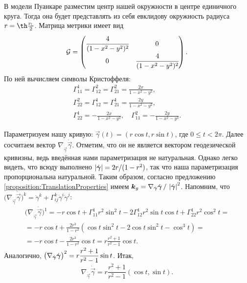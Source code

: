 \begin{solution}
	В модели Пуанкаре разместим центр нашей окружности в центре единичного круга. Тогда она будет представлять из себя евклидову окружность радиуса $r = \th\frac{r_{\mathbb{L}}}{2}$. Матрица метрики имеет вид
	\[
		\mathcal{G} =
		\begin{pmatrix}
			\cfrac{4}{(1 - x^2 - y^2)^2} & 0\\
			0 & \cfrac{4}{(1 - x^2 - y^2)^2}\\
		\end{pmatrix}.
	\]
	По ней вычисляем символы Кристоффеля:
	\begin{gather*}
		\Gamma_{11}^1 = \Gamma_{12}^2 = \Gamma_{21}^2 = \frac{2x}{1 - x^2 - y^2},\\
		\Gamma_{22}^2 = \Gamma_{12}^1 = \Gamma_{21}^1 = \frac{2y}{1 - x^2 - y^2},\\
		\Gamma_{22}^1 = -\frac{2x}{1 - x^2 - y^2},\quad\Gamma_{11}^2 = -\frac{2y}{1 - x^2 - y^2}.
	\end{gather*}

	Параметризуем нашу кривую: $\vec{\gamma}(t) = (r\cos t, r\sin t)$, где $0 \leqslant t < 2\pi$. Далее сосчитаем вектор $\nabla_{\dot{\vec{\gamma}}}\dot{\vec{\gamma}}$. Отметим, что он не является вектором геодезической кривизны, ведь введённая нами параметризация не натуральная. Однако легко видеть, что всюду выполнено $\left\lvert\dot{\boldsymbol{\gamma}}\right\rvert = 2r / (1 - r^2)$, так что наша параметризация пропорциональна натуральной. Таким образом, согласно предложению \ref{proposition:TranslationProperties} имеем $\boldsymbol{k}_g = \nabla_{\dot{\boldsymbol{\gamma}}}\dot{\boldsymbol{\gamma}}\,/\,\left\lvert\dot{\boldsymbol{\gamma}}\right\rvert^2$. Напомним, что $\big(\nabla_{\dot{\vec{\gamma}}}\dot{\vec{\gamma}}\big)^k = \ddot{\gamma}^k + \Gamma_{ij}^k\dot{\gamma}^i\dot{\gamma}^j$:
	\begin{multline*}
		\big(\nabla_{\dot{\vec{\gamma}}}\dot{\vec{\gamma}}\big)^1 = -r\cos t + \Gamma_{11}^1r^2\sin^2t - 2\Gamma_{12}^1r^2\sin t\cos t + \Gamma_{22}^1r^2\cos^2t =\\ = -r\cos t + \frac{2r^3}{1 - r^2}(\cos t\sin^2t - 2\cos t\sin^2t - \cos^3t) =\\ = -r\cos t - \frac{2r^3}{1 - r^2}\cos t = r\frac{r^2 + 1}{r^2 - 1}\cos t.
	\end{multline*}
	Аналогично, $\displaystyle\big(\nabla_{\dot{\boldsymbol{\gamma}}}\dot{\boldsymbol{\gamma}}\big)^2 = r\frac{r^2 + 1}{r^2 - 1}\sin t$. Итак,
	\[
		\nabla_{\dot{\vec{\gamma}}}\dot{\vec{\gamma}} = r\frac{r^2 + 1}{r^2 - 1}(\cos t, \sin t).
	\]


\end{solution}
